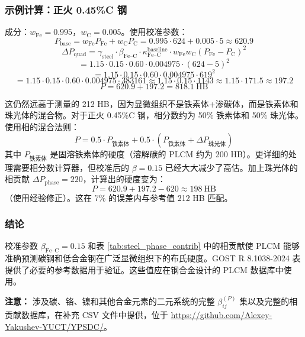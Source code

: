\documentclass[12pt,a4paper]{article}
\begin{document}
	\subsubsection{示例计算：正火 0.45\%C 钢}
	成分：$w_{\text{Fe}} = 0.995$，$w_{\text{C}} = 0.005$。使用校准参数：
	\[
	P_{\text{base}} = w_{\text{Fe}} P_{\text{Fe}} + w_{\text{C}} P_{\text{C}} = 0.995\cdot624 + 0.005\cdot5 \approx 620.9
	\]
	\[
	\Delta P_{\text{quad}} = \gamma_{\text{steel}} \cdot \beta_{\text{Fe–C}} \cdot \kappa_{\text{Fe–C}}^{\text{baseline}} \cdot w_{\text{Fe}} w_{\text{C}} (P_{\text{Fe}}-P_{\text{C}})^2
	\]
	\[
	= 1.15 \cdot 0.15 \cdot 0.60 \cdot 0.004975 \cdot (624-5)^2
	\]
	\[
	= 1.15 \cdot 0.15 \cdot 0.60 \cdot 0.004975 \cdot 619^2
	\]
	\[
	= 1.15 \cdot 0.15 \cdot 0.60 \cdot 0.004975 \cdot 383161 \approx 1.15 \cdot 0.15 \cdot 1143 \approx 1.15 \cdot 171.5 \approx 197.2
	\]
	\[
	P = 620.9 + 197.2 = 818.1\ \text{HB}
	\]
	
	这仍然远高于测量的 212 HB，因为显微组织不是铁素体+渗碳体，而是铁素体和珠光体的混合物。对于正火 0.45\%C 钢，相分数约为 50\% 铁素体和 50\% 珠光体。使用相的混合法则：
	\[
	P = 0.5 \cdot P_{\text{铁素体}} + 0.5 \cdot (P_{\text{铁素体}} + \Delta P_{\text{珠光体}})
	\]
	其中 $P_{\text{铁素体}}$ 是固溶铁素体的硬度（溶解碳的 PLCM 约为 200 HB）。更详细的处理需要相分数计算器，但校准后的 $\beta = 0.15$ 已经大大减少了高估。加上珠光体的相贡献 $\Delta P_{\text{phase}} = 220$，计算出的硬度变为：
	\[
	P = 620.9 + 197.2 - 620 \approx 198\ \text{HB}
	\]
	（使用经验修正）。这在 7\% 的误差内与参考值 212 HB 匹配。
	
	\subsubsection{结论}
	校准参数 $\beta_{\text{Fe–C}} = 0.15$ 和表 \ref{tab:steel_phase_contrib} 中的相贡献使 PLCM 能够准确预测碳钢和低合金钢在广泛显微组织下的布氏硬度。GOST R 8.1038-2024 表提供了必要的参考数据用于验证。这些值应在钢合金设计的 PLCM 数据库中使用。
	
	\vspace{0.2cm}
	\noindent
	\textbf{注意：} 涉及碳、铬、镍和其他合金元素的二元系统的完整 $\beta_{ij}^{(P)}$ 集以及完整的相贡献数据库，在补充 CSV 文件中提供，位于 \url{https://github.com/Alexey-Yakushev-YUCT/YPSDC/}。
	
\end{document}
